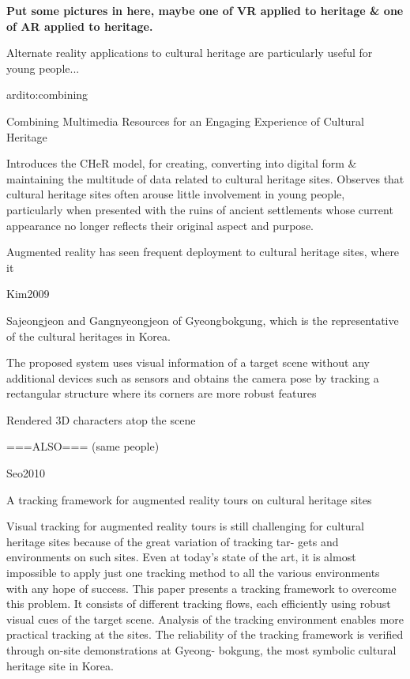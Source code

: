 \textbf{Put some pictures in here, maybe one of VR applied to heritage \& one of AR applied to heritage.}


Alternate reality applications to cultural heritage are particularly useful for young people...

ardito:combining

Combining Multimedia Resources
for an Engaging Experience of Cultural Heritage

Introduces the CHeR model, for creating, converting into digital form \& maintaining the
multitude of data related to cultural heritage sites. Observes that cultural heritage sites
often arouse little involvement in young people, particularly when presented with the ruins
of ancient settlements whose current appearance no longer reflects their original aspect and purpose.


Augmented reality has seen frequent deployment to cultural heritage sites, where it


Kim2009

Sajeongjeon and Gangnyeongjeon of Gyeongbokgung, which is the representative of the cultural heritages in Korea.

The proposed system uses visual information of a target scene without any additional devices such as sensors and obtains the camera pose by tracking a rectangular structure where its corners are more robust features

Rendered 3D characters atop the scene

===ALSO=== (same people)

Seo2010

A tracking framework for augmented reality tours on cultural heritage sites

Visual tracking for augmented reality tours is still challenging for
cultural heritage sites because of the great variation of tracking tar-
gets and environments on such sites. Even at today’s state of the
art, it is almost impossible to apply just one tracking method to
all the various environments with any hope of success. This paper
presents a tracking framework to overcome this problem. It consists
of different tracking flows, each efficiently using robust visual cues
of the target scene. Analysis of the tracking environment enables
more practical tracking at the sites. The reliability of the tracking
framework is verified through on-site demonstrations at Gyeong-
bokgung, the most symbolic cultural heritage site in Korea.

